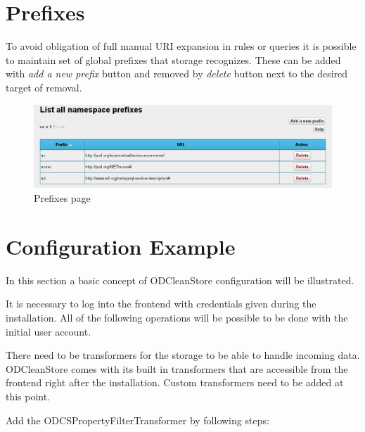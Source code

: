 \section{Prefixes}
\label{sec:frontendPrefixMgmt}

To avoid obligation of full manual URI expansion in  rules or queries it is possible to maintain set of global  prefixes that storage recognizes. These can be added with \emph{add a new prefix} button and removed by \emph{delete} button next to the desired target of removal.

\begin{figure}[!ht]
    \centering
    \includegraphics[width=\textwidth]{images/fe-prefixes.png}
    \caption{Prefixes page}
	\label{fig:fePrefixes}
\end{figure}

\section{Configuration Example}

In this section a basic concept of ODCleanStore configuration will be illustrated.

It is necessary to log into the frontend with credentials given during the installation. All of the following operations will be possible to be done with the initial user account.

There need to be transformers for the storage to be able to handle incoming data. ODCleanStore comes with its built in transformers that are accessible from the frontend right after the installation. Custom transformers need to be added at this point.

Add the ODCSPropertyFilterTransformer by following steps:

\newpage
